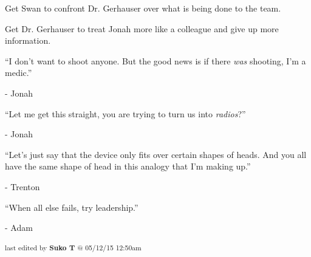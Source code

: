 Get Swan to confront Dr. Gerhauser over what is being done to the team.


Get Dr. Gerhauser to treat Jonah more like a colleague and give up more information.






 ``I don't want to shoot anyone.  But the good news is if there \textit{was} shooting, I'm a medic.''

        - Jonah

``Let me get this straight, you are trying to turn us into \textit{radios}?''

        - Jonah



``Let's just say that the device only fits over certain shapes of heads.  And you all have the same shape of head in this analogy that I'm making up.''

        - Trenton



``When all else fails, try leadership.''

        - Adam


\iffalse

======================
THESE ARE ERRORS ENCOUNTERED DURING THE EXPORT PROCESS
======================

	Unable to highlight for footnote: This whole convo was not noted very well, I was catching up on Jaya vs Morgan notes.  Please fix if you can., unable to correctly match (exceeded acceptable limit):Expected???  You should ask Jari about that.”
“Anything up to and including rifles”

	Unable to highlight for footnote: This whole convo was not noted very well, I was catching up on Jaya vs Morgan notes.  Please fix if you can. because:GivenExpected“You should ask Jari about that.” “Anything up to and including rifles”???  You should ask Jari about that.”
“Anything up to and including rifles”


\fi

\vspace{\fill}

\begin{flushright}
\textsubscript{last edited by \textbf{Suko T} @ 05/12/15 12:50am}
\end{flushright}

